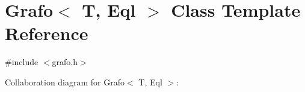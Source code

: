 \hypertarget{classGrafo}{}\section{Grafo$<$ T, Eql $>$ Class Template Reference}
\label{classGrafo}


{\ttfamily \#include $<$grafo.\+h$>$}



Collaboration diagram for Grafo$<$ T, Eql $>$\+:
